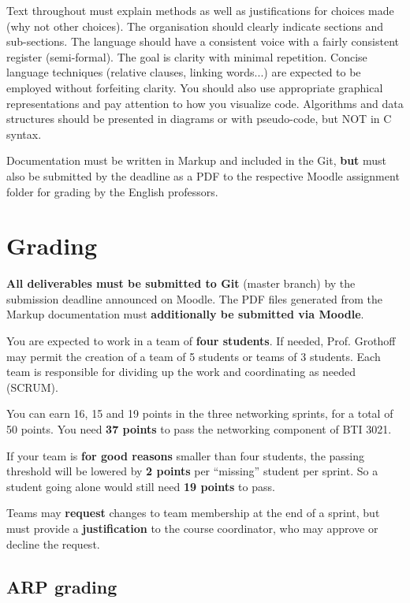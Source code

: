 \documentclass{article}
\begin{document}
Text throughout must explain methods as well as justifications for
choices made (why not other choices). The organisation should clearly
indicate sections and sub-sections.  The language should have a
consistent voice with a fairly consistent register (semi-formal).  The
goal is clarity with minimal repetition.  Concise language techniques
(relative clauses, linking words...) are expected to be employed
without forfeiting clarity.  You should also use appropriate graphical
representations and pay attention to how you visualize code.
Algorithms and data structures should be presented in diagrams or with
pseudo-code, but NOT in C syntax.

Documentation must be written in Markup and included in the Git, {\bf
  but} must also be submitted by the deadline as a PDF to the
respective Moodle assignment folder for grading by the English
professors.


\section{Grading}

{\bf All deliverables must be submitted to Git} (master branch) by the
submission deadline announced on Moodle. The PDF files generated from
the Markup documentation  must {\bf additionally be submitted via Moodle}.

You are expected to work in a team of {\bf four students}.  If needed,
Prof. Grothoff may permit the creation of a team of 5 students or
teams of 3 students.  Each team is responsible for dividing up the
work and coordinating as needed (SCRUM).

You can earn 16, 15 and 19 points in the three networking sprints, for
a total of 50 points.  You need {\bf 37 points} to pass the networking
component of BTI 3021.

If your team is {\bf for good reasons} smaller than four students, the
passing threshold will be lowered by {\bf 2 points} per ``missing''
student per sprint.  So a student going alone would still need {\bf 19
  points} to pass.

Teams may {\bf request} changes to team membership at the end of a
sprint, but must provide a {\bf justification} to the course
coordinator, who may approve or decline the request.


\subsection{ARP grading}
\end{document}
